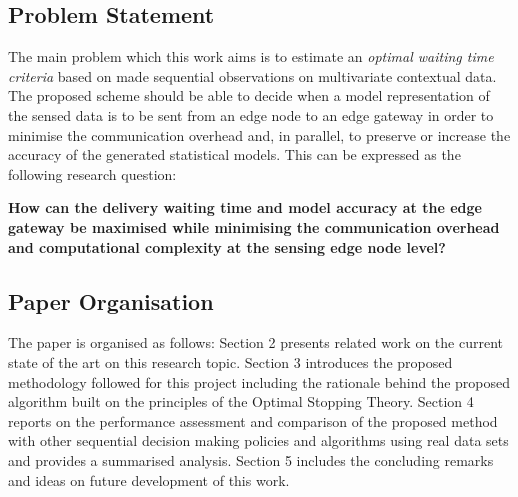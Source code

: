 \documentclass{mpaper}
\begin{document}
\subsection*{Problem Statement}
The main problem which this work aims is to estimate an \textit{optimal waiting time criteria} based on made sequential observations on multivariate contextual data. The proposed scheme should be able to decide when a model representation of the sensed data is to be sent from an edge node to an edge gateway in order to minimise the communication overhead and, in parallel, to preserve or increase the accuracy of the generated statistical models. This can be expressed as the following research question:


\textbf{How can the delivery waiting time and model accuracy at the edge gateway be maximised while minimising the communication overhead and computational complexity at the sensing edge node level?}

\subsection*{Paper Organisation}
The paper is organised as follows: Section 2 presents related work on the current state of the art on this research topic. Section 3 introduces the proposed methodology followed for this project including the rationale behind the proposed algorithm built on the principles of the Optimal Stopping Theory. Section 4 reports on the performance assessment and comparison of the proposed method with other sequential decision making policies and algorithms using real data sets and provides a summarised analysis. Section 5 includes the concluding remarks and ideas on future development of this work.
\end{document}
